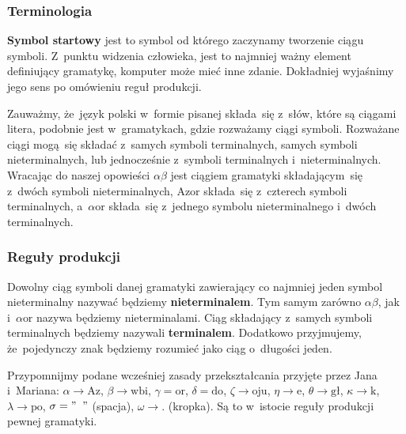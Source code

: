 \documentclass[10pt,t]{beamer}
\begin{document}
\begin{frame}
  \frametitle{Terminologia}


  \textbf{Symbol startowy} jest to symbol od którego zaczynamy tworzenie
  ciągu symboli. Z~punktu widzenia człowieka, jest to najmniej ważny
  element definiujący gramatykę, komputer może mieć inne zdanie. Dokładniej
  wyjaśnimy jego sens po omówieniu reguł produkcji.

  Zauważmy, że~język polski w~formie pisanej składa~się z~słów, które są
  ciągami litera, podobnie jest w~gramatykach, gdzie rozważamy ciągi
  symboli. Rozważane ciągi mogą~się składać z~samych symboli terminalnych,
  samych symboli nieterminalnych, lub jednocześnie z~symboli terminalnych
  i~nieterminalnych. Wracając do naszej opowieści $\alpha\beta$ jest ciągiem
  gramatyki składającym~się z~dwóch symboli nieterminalnych, $\text{Azor}$
  składa~się z~czterech symboli terminalnych, a~$\alpha\text{or}$ składa~się
  z~jednego symbolu nieterminalnego i~dwóch terminalnych.

\end{frame}





\begin{frame}
  \frametitle{Reguły produkcji}


  Dowolny ciąg symboli danej gramatyki zawierający co najmniej jeden symbol
  nieterminalny nazywać będziemy \textbf{nieterminalem}. Tym samym zarówno
  $\alpha\beta$, jak i~$\alpha\text{or}$ nazywa będziemy nieterminalami. Ciąg składający
  z~samych symboli terminalnych będziemy nazywali \textbf{terminalem}.
  Dodatkowo przyjmujemy, że~pojedynczy znak będziemy rozumieć jako ciąg
  o~długości jeden.

  Przypomnijmy podane wcześniej zasady przekształcania przyjęte przez
  Jana i~Mariana: $\alpha \to \text{Az}$, $\beta \to \text{wbi}$, $\gamma = \text{or}$,
  $\delta = \text{do}$, $\zeta \to \text{oju}$, $\eta \to \text{e}$, $\theta \to \text{gł}$,
  $\kappa \to \text{k}$, $\lambda \to \text{po}$, $\sigma = "\;\;"$ (spacja),
  $\omega \to .$ (kropka). Są to w~istocie reguły produkcji pewnej gramatyki.

\end{frame}
\end{document}
